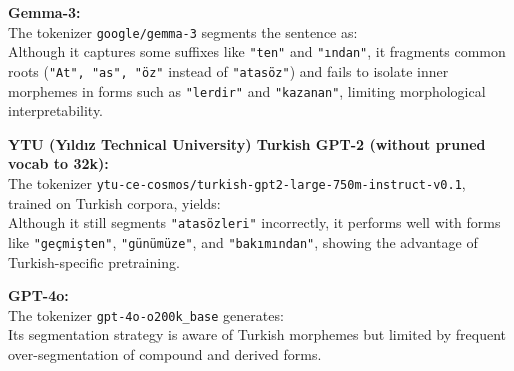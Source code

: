\vspace{1em}

\textbf{Gemma-3:} \\
The tokenizer \texttt{google/gemma-3} segments the sentence as: \\
Although it captures some suffixes like \texttt{"ten"} and \texttt{"ından"}, it fragments common roots (\texttt{"At", "as", "öz"} instead of \texttt{"atasöz"}) and fails to isolate inner morphemes in forms such as \texttt{"lerdir"} and \texttt{"kazanan"}, limiting morphological interpretability.

\vspace{1em}

\textbf{YTU (Yıldız Technical University) Turkish GPT-2 (without pruned vocab to 32k):} \\
The tokenizer \texttt{ytu-ce-cosmos/turkish-gpt2-large-750m-instruct-v0.1}, trained on Turkish corpora, yields: \\
Although it still segments \texttt{"atasözleri"} incorrectly, it performs well with forms like \texttt{"geçmişten"}, \texttt{"günümüze"}, and \texttt{"bakımından"}, showing the advantage of Turkish-specific pretraining.

\vspace{1em}

\textbf{GPT-4o:} \\
The tokenizer \texttt{gpt-4o-o200k\_base} generates: \\
Its segmentation strategy is aware of Turkish morphemes but limited by frequent over-segmentation of compound and derived forms.

\vspace{1em}

